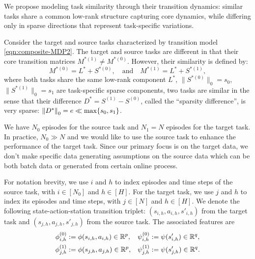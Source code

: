 We propose modeling task similarity through their transition dynamics: similar tasks share a common low-rank structure capturing core dynamics, while differing only in sparse directions that represent task-specific variations.

\begin{assumption}\label{assume:transition-similarity}
Consider the target and source tasks characterized by transition model \eqref{eqn:composite-MDP2}. 
The target and source tasks are different in that their core transition matrices $M^{*(1)} \ne M^{*(0)}$. 
However, their similarity is defined by:
\begin{equation}
  M^{*(0)} =  L^* +  S^{*(0)}, 
\quad\text{and}\quad
  M^{*(1)} =  L^* +  S^{*(1)},
\end{equation}
where both tasks share the same low-rank component $L^*$, $\lVert  S^{*(0)} \rVert_0 = s_0$,  $\lVert  S^{*(1)} \rVert_0 = s_1$ are task-specific sparse components, two tasks are similar in the sense that their difference $D^* = S^{(1)} - S^{(0)}$, called the ``sparsity difference'', is very sparse: $\left\lVert D^*\right\rVert_0 = e \ll \max\{s_0, s_1\}$. 
\end{assumption}


We have $N_0$ episodes for the source task and $N_1=N$ episodes for the target task. 
In practice, $N_0 \gg N$ and we would like to use the source task to enhance the performance of the target task. Since our primary focus is on the target data, we don't make specific data generating assumptions on the source data which can be both batch data or generated from certain online process.

For notation brevity, we use $i$ and $h$ to index episodes and time steps of the source task, with $i \in [N_0]$ and $h \in [H]$. For the target task, we use $j$ and $h$ to index its episodes and time steps, with $j \in [N]$ and $h \in [H]$.
We denote the following state-action-station transition triplet: $(s_{i, h}, a_{i, h}, s'_{i, h})$ from the target task and $(s_{j, h}, a_{j, h}, s'_{j, h})$ from the source task.
The associated features are 
\begin{equation}
\begin{aligned}
    \phi_{i, h}^{(0)} &:= \phi(s_{i, h}, a_{i, h}) \in \mathbb{R}^p, & \psi_{i, h}^{(0)} &:= \psi(s'_{i, h}) \in \mathbb{R}^{q}, \\
    \phi_{j, h}^{(1)} &:= \phi(s_{j, h}, a_{j, h}) \in \mathbb{R}^p, & \psi_{j, h}^{(1)} &:= \psi(s'_{j, h}) \in \mathbb{R}^{q}.
\end{aligned}
\end{equation}

